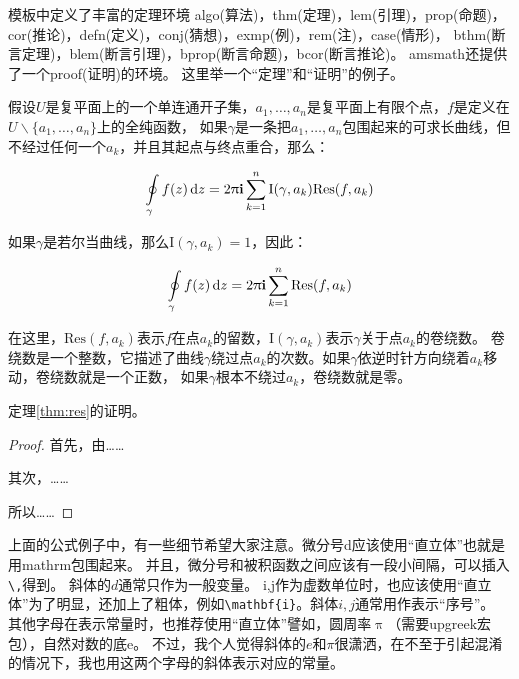 模板中定义了丰富的定理环境
algo(算法)，thm(定理)，lem(引理)，prop(命题)，cor(推论)，defn(定义)，conj(猜想)，exmp(例)，rem(注)，case(情形)，
bthm(断言定理)，blem(断言引理)，bprop(断言命题)，bcor(断言推论)。
amsmath还提供了一个proof(证明)的环境。
这里举一个“定理”和“证明”的例子。
\begin{theorem}[留数定理]
\label{thm:res}
  假设$U$是复平面上的一个单连通开子集，$a_1,\ldots,a_n$是复平面上有限个点，$f$是定义在$U\backslash \{a_1,\ldots,a_n\}$上的全纯函数，
  如果$\gamma$是一条把$a_1,\ldots,a_n$包围起来的可求长曲线，但不经过任何一个$a_k$，并且其起点与终点重合，那么：

  \begin{equation}
    \label{eq:res}
    \ointop_{\gamma}f(z)\,\mathrm{d}z = 2\uppi\mathbf{i}\sum^n_{k=1}\mathrm{I}(\gamma,a_k)\mathrm{Res}(f,a_k)
  \end{equation}

  如果$\gamma$是若尔当曲线，那么$\mathrm{I}(\gamma, a_k)=1$，因此：

  \begin{equation}
    \label{eq:resthm}
    \ointop_{\gamma}f(z)\,\mathrm{d}z = 2\uppi\mathbf{i}\sum^n_{k=1}\mathrm{Res}(f,a_k)
  \end{equation}


  在这里，$\mathrm{Res}(f, a_k)$表示$f$在点$a_k$的留数，$\mathrm{I}(\gamma,a_k)$表示$\gamma$关于点$a_k$的卷绕数。
  卷绕数是一个整数，它描述了曲线$\gamma$绕过点$a_k$的次数。如果$\gamma$依逆时针方向绕着$a_k$移动，卷绕数就是一个正数，
  如果$\gamma$根本不绕过$a_k$，卷绕数就是零。

  定理\ref{thm:res}的证明。

  \begin{proof}
    首先，由……

    其次，……

    所以……
  \end{proof}
\end{theorem}

上面的公式例子中，有一些细节希望大家注意。微分号d应该使用“直立体”也就是用mathrm包围起来。
并且，微分号和被积函数之间应该有一段小间隔，可以插入\verb+\,+得到。
斜体的$d$通常只作为一般变量。
i,j作为虚数单位时，也应该使用“直立体”为了明显，还加上了粗体，例如\verb+\mathbf{i}+。斜体$i,j$通常用作表示“序号”。
其他字母在表示常量时，也推荐使用“直立体”譬如，圆周率$\uppi$（需要upgreek宏包），自然对数的底$\mathrm{e}$。
不过，我个人觉得斜体的$e$和$\pi$很潇洒，在不至于引起混淆的情况下，我也用这两个字母的斜体表示对应的常量。


